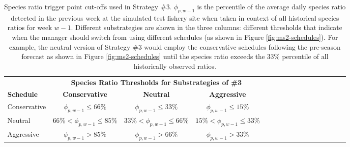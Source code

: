 \documentclass[12pt,]{book}
\theoremstyle{definition}
\theoremstyle{definition}
\theoremstyle{definition}
\theoremstyle{remark}
\begin{document}
\begin{singlespace}

\begin{table}

\caption{\label{tab:ms3-ratio-table}Species ratio trigger point cut-offs used in Strategy \#3. $\phi_{p, w-1}$ is the percentile of the average daily species ratio detected in the previous week at the simulated test fishery site when taken in context of all historical species ratios for week $w-1$. Different substrategies are shown in the three columns: different thresholds that indicate when the manager should switch from using different schedules (as shown in Figure \ref{fig:ms2-schedules}). For example, the neutral version of Strategy \#3 would employ the conservative schedules following the pre-season forecast as shown in Figure \ref{fig:ms2-schedules} until the species ratio exceeds the 33\% percentile of all historically observed ratios.}
\centering
\begin{tabular}[t]{lccclccclccclccc}
\toprule
\multicolumn{1}{c}{\bfseries } & \multicolumn{3}{c}{\bfseries Species Ratio Thresholds for Substrategies of \#3} \\
\cmidrule(l{2pt}r{2pt}){2-4}
\textbf{Schedule} & \textbf{Conservative} & \textbf{Neutral} & \textbf{Aggressive}\\
\midrule
Conservative & $\phi_{p, w-1} \le 66\%$ & $\phi_{p, w-1} \le 33\%$ & $\phi_{p, w-1} \le 15\%$\\
Neutral & $66 \% < \phi_{p, w-1} \le 85\%$ & $33 \% < \phi_{p, w-1} \le 66\%$ & $15 \% < \phi_{p, w-1} \le 33\%$\\
Aggressive & $\phi_{p, w-1} > 85\%$ & $\phi_{p, w-1} > 66\%$ & $\phi_{p, w-1} > 33\%$\\
\bottomrule
\end{tabular}
\end{table}

\clearpage

\begin{table}


\end{table}
\end{singlespace}
\end{document}
